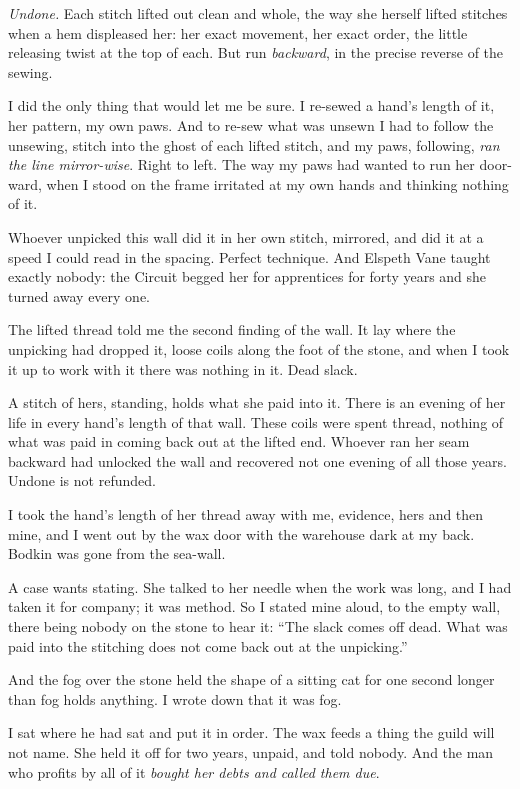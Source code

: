 \emph{Undone.} Each stitch lifted out clean and whole, the way she herself lifted stitches when a hem displeased her: her exact movement, her exact order, the little releasing twist at the top of each. But run \emph{backward}, in the precise reverse of the sewing.

I did the only thing that would let me be sure. I re-sewed a hand's length of it, her pattern, my own paws. And to re-sew what was unsewn I had to follow the unsewing, stitch into the ghost of each lifted stitch, and my paws, following, \emph{ran the line mirror-wise}. Right to left. The way my paws had wanted to run her door-ward, when I stood on the frame irritated at my own hands and thinking nothing of it.

Whoever unpicked this wall did it in her own stitch, mirrored, and did it at a speed I could read in the spacing. Perfect technique. And Elspeth Vane taught exactly nobody: the Circuit begged her for apprentices for forty years and she turned away every one.

The lifted thread told me the second finding of the wall. It lay where the unpicking had dropped it, loose coils along the foot of the stone, and when I took it up to work with it there was nothing in it. Dead slack.

A stitch of hers, standing, holds what she paid into it. There is an evening of her life in every hand's length of that wall. These coils were spent thread, nothing of what was paid in coming back out at the lifted end. Whoever ran her seam backward had unlocked the wall and recovered not one evening of all those years. Undone is not refunded.

I took the hand's length of her thread away with me, evidence, hers and then mine, and I went out by the wax door with the warehouse dark at my back. Bodkin was gone from the sea-wall.

A case wants stating. She talked to her needle when the work was long, and I had taken it for company; it was method. So I stated mine aloud, to the empty wall, there being nobody on the stone to hear it: ``The slack comes off dead. What was paid into the stitching does not come back out at the unpicking.''

And the fog over the stone held the shape of a sitting cat for one second longer than fog holds anything. I wrote down that it was fog.

I sat where he had sat and put it in order. The wax feeds a thing the guild will not name. She held it off for two years, unpaid, and told nobody. And the man who profits by all of it \emph{bought her debts and called them due}.

